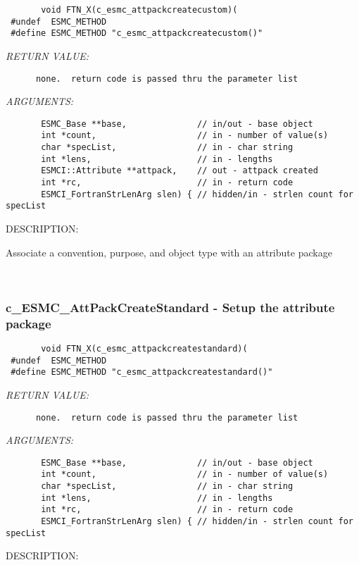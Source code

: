   
\begin{verbatim}       void FTN_X(c_esmc_attpackcreatecustom)(
 #undef  ESMC_METHOD
 #define ESMC_METHOD "c_esmc_attpackcreatecustom()"\end{verbatim}{\em RETURN VALUE:}
\begin{verbatim}      none.  return code is passed thru the parameter list
   \end{verbatim}{\em ARGUMENTS:}
\begin{verbatim}       ESMC_Base **base,              // in/out - base object
       int *count,                    // in - number of value(s)
       char *specList,                // in - char string
       int *lens,                     // in - lengths
       ESMCI::Attribute **attpack,    // out - attpack created
       int *rc,                       // in - return code
       ESMCI_FortranStrLenArg slen) { // hidden/in - strlen count for specList
   \end{verbatim}
{\sf DESCRIPTION:\\ }


       Associate a convention, purpose, and object type with an attribute package
   
 
\mbox{}\hrulefill\ 
 
\subsubsection [c\_ESMC\_AttPackCreateStandard] {c\_ESMC\_AttPackCreateStandard - Setup the attribute package}


  
\begin{verbatim}       void FTN_X(c_esmc_attpackcreatestandard)(
 #undef  ESMC_METHOD
 #define ESMC_METHOD "c_esmc_attpackcreatestandard()"\end{verbatim}{\em RETURN VALUE:}
\begin{verbatim}      none.  return code is passed thru the parameter list
   \end{verbatim}{\em ARGUMENTS:}
\begin{verbatim}       ESMC_Base **base,              // in/out - base object
       int *count,                    // in - number of value(s)
       char *specList,                // in - char string
       int *lens,                     // in - lengths
       int *rc,                       // in - return code
       ESMCI_FortranStrLenArg slen) { // hidden/in - strlen count for specList
   \end{verbatim}
{\sf DESCRIPTION:\\ }


